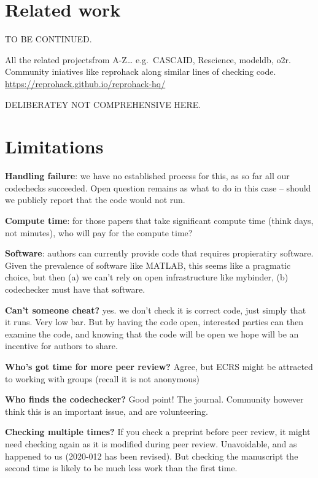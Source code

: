 \documentclass[12pt]{article}
\begin{document}
\section*{Related work}\label{related-work}

TO BE CONTINUED.

All the related projectsfrom A-Z\ldots{} e.g.~CASCAID, Rescience,
modeldb, o2r. Community iniatives like reprohack along similar lines of
checking code. \url{https://reprohack.github.io/reprohack-hq/}

DELIBERATEY NOT COMPREHENSIVE HERE.

\section*{Limitations}\label{limitations}

\textbf{Handling failure}: we have no established process for this, as
so far all our codechecks succeeded. Open question remains as what to do
in this case -- should we publicly report that the code would not run.

\textbf{Compute time}: for those papers that take significant compute
time (think days, not minutes), who will pay for the compute time?

\textbf{Software}: authors can currently provide code that requires
propieratiry software. Given the prevalence of software like MATLAB,
this seems like a pragmatic choice, but then (a) we can't rely on open
infrastructure like mybinder, (b) codechecker must have that software.

\textbf{Can't someone cheat?} yes. we don't check it is correct code,
just simply that it runs. Very low bar. But by having the code open,
interested parties can then examine the code, and knowing that the code
will be open we hope will be an incentive for authors to share.

\textbf{Who's got time for more peer review?} Agree, but ECRS might be
attracted to working with groups (recall it is not anonymous)

\textbf{Who finds the codechecker?} Good point! The journal. Community
however think this is an important issue, and are volunteering.

\textbf{Checking multiple times?}  If you check a preprint before peer
review, it might need checking again as it is modified during peer
review.  Unavoidable, and as happened to us (2020-012 has been
revised).  But checking the manuscript the second time is likely to be
much less work than the first time.
\end{document}
